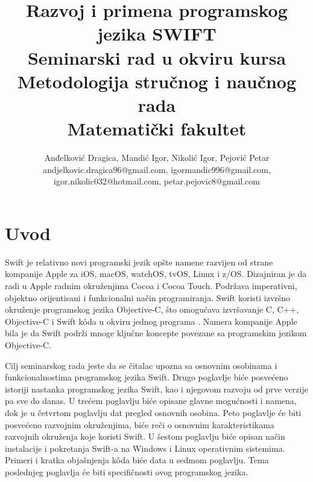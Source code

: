 \documentclass[a4paper]{article}
\begin{document}
\title{Razvoj i primena programskog jezika SWIFT \\ \small{Seminarski rad u okviru kursa\\Metodologija stručnog i naučnog rada\\ Matematički fakultet}}

\author{Anđelković Dragica, Mandić Igor, Nikolić Igor, Pejović  Petar\\ andjelkovic.dragica96@gmail.com,  igormandic996@gmail.com, \\ igor.nikolic032@hotmail.com, petar.pejovic8@gmail.com}


\maketitle



\tableofcontents

\newpage

\section{Uvod}
\label{sec:prviDeo}
Swift je relativno novi programski jezik opšte namene razvijen od strane kompanije Apple za iOS, macOS, watchOS, tvOS, Linux i z/OS. Dizajniran je da radi u Apple radnim okruženjima Cocoa i Cocoa Touch. Podržava imperativni, objektno orijentisani i funkcionalni način programiranja. Swift koristi izvršno okruženje programskog jezika Objective-C, što omogućava izvršavanje C, C++, Objective-C i Swift k\^{o}da u okviru jednog programa \cite{arc_sajt}. Namera kompanije Apple bila je da Swift podrži mnoge ključne koncepte povezane sa programskim jezikom Objective-C.

Cilj seminarskog rada jeste da se čitalac upozna sa osnovnim osobinama i funkcionalnostima programskog jezika Swift. Drugo poglavlje biće posvećeno istoriji nastanka programskog jezika Swift, kao i njegovom razvoju od prve verzije pa sve do danas. U trećem poglavlju biće opisane glavne mogućnosti i namena, dok je u četvrtom poglavlju dat pregled osnovnih osobina. Peto poglavlje će biti posvećeno razvojnim okruženjima, biće reči o osnovnim karakteristikama  razvojnih okruženja koje koristi Swift. U šestom poglavlju biće opisan način instalacije i pokretanja Swift-a na Windows i Linux operativnim sistemima. Primeri i kratka objašnjenja k\^{o}da biće data u sedmom poglavlju. Tema poslednjeg poglavlja će biti specifičnosti ovog programskog jezika.
\end{document}
